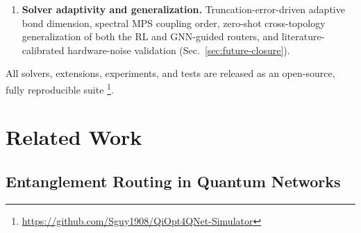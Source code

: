 \documentclass[twocolumn]{article}
\begin{document}
\begin{enumerate}
    $\epsilon$-constraint frontiers, $k$-disjoint-path provisioning,
    swap-tree ordering under memory decay, generative topology
    families, time-dependent decoherence-aware routing, a
    Q-learning router, hardware-parameter profiles, and
    price-of-anarchy/worst-case-scenario baselines that contextualize
    the centralized QUBO against decentralized and uncertainty-hedged
    alternatives (Sec.~\ref{sec:extensions}).
  \item \textbf{Solver adaptivity and generalization.}
    Truncation-error-driven adaptive bond dimension, spectral MPS
    coupling order, zero-shot cross-topology generalization of both
    the RL and GNN-guided routers, and literature-calibrated
    hardware-noise validation (Sec.~\ref{sec:future-closure}).
\end{enumerate}
All solvers, extensions, experiments, and tests are released as an
open-source, fully reproducible suite%
\footnote{\url{https://github.com/Sguy1908/QiOpt4QNet-Simulator}}.

\section{Related Work}
\label{sec:related}

\subsection{Entanglement Routing in Quantum Networks}
\label{sec:related-net}
\end{document}

